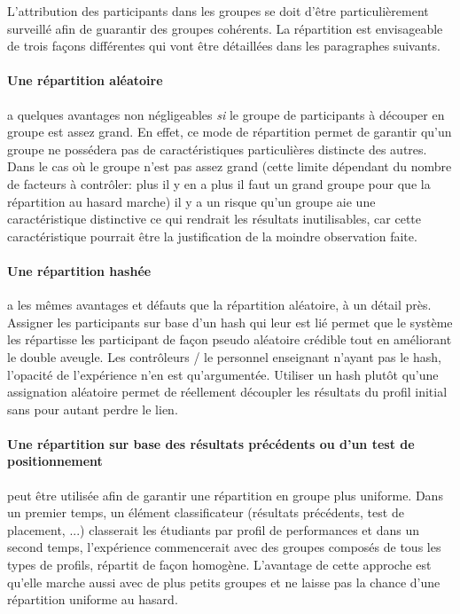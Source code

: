 \documentclass[a4paper]{report}
\begin{document}
L'attribution des participants dans les groupes se doit d'être particulièrement surveillé afin de guarantir des groupes cohérents.
La répartition est envisageable de trois façons différentes qui vont être détaillées dans les paragraphes suivants.

\paragraph{Une répartition aléatoire} a quelques avantages non négligeables \textit{si} le groupe de participants à découper en groupe est assez grand.
En effet, ce mode de répartition permet de garantir qu'un groupe ne possédera pas de caractéristiques particulières distincte des autres.
Dans le cas où le groupe n'est pas assez grand (cette limite dépendant du nombre de facteurs à contrôler: plus il y en a plus il faut un grand groupe pour que la répartition au hasard marche) il y a un risque qu'un groupe aie une caractéristique distinctive ce qui rendrait les résultats inutilisables, car cette caractéristique pourrait être la justification de la moindre observation faite.

\paragraph{Une répartition hashée} a les mêmes avantages et défauts que la répartition aléatoire, à un détail près.
Assigner les participants sur base d'un hash qui leur est lié permet que le système les répartisse les participant de façon pseudo aléatoire crédible tout en améliorant le double aveugle.
Les contrôleurs / le personnel enseignant n'ayant pas le hash, l'opacité de l'expérience n'en est qu'argumentée.
Utiliser un hash plutôt qu'une assignation aléatoire permet de réellement découpler les résultats du profil initial sans pour autant perdre le lien.


\paragraph{Une répartition sur base des résultats précédents ou d'un test de positionnement} peut être utilisée afin de garantir une répartition en groupe plus uniforme.
Dans un premier temps, un élément classificateur (résultats précédents, test de placement, ...) classerait les étudiants par profil de performances \cite{Hormaux} et dans un second temps, l'expérience commencerait avec des groupes composés de tous les types de profils, répartit de façon homogène.
L'avantage de cette approche est qu'elle marche aussi avec de plus petits groupes et ne laisse pas la chance d'une répartition uniforme au hasard.
\end{document}
